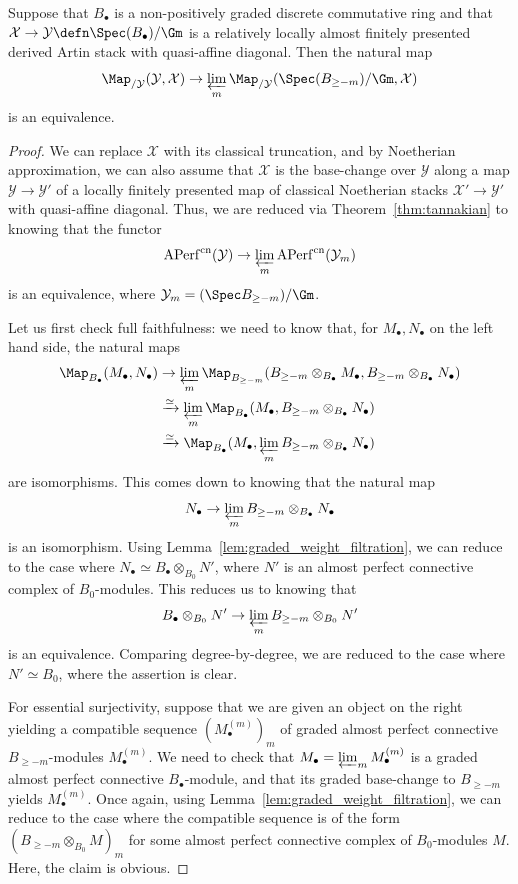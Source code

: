 \documentclass[10pt]{amsart}
\begin{document}
\begin{proposition}
\label{prop:graded_completeness}
Suppose that $B_\bullet$ is a non-positively graded discrete commutative ring and that $\mathcal{X}\to \mathcal{Y}\defn \Spec(B_\bullet)/\Gm$ is a relatively locally almost finitely presented derived Artin stack with quasi-affine diagonal. Then the natural map
\[
\Map_{/\mathcal{Y}}(\mathcal{Y},\mathcal{X})\to \varprojlim_m \Map_{/\mathcal{Y}}(\Spec(B_{\ge -m})/\Gm,\mathcal{X})
\]
is an equivalence.
\end{proposition}  
\begin{proof}
 We can replace $\mathcal{X}$ with its classical truncation, and by Noetherian approximation, we can also assume that $\mathcal{X}$ is the base-change over $\mathcal{Y}$ along a map $\mathcal{Y}\to \mathcal{Y}'$ of a locally finitely presented map of classical Noetherian stacks $\mathcal{X}'\to \mathcal{Y}'$ with quasi-affine diagonal. Thus, we are reduced via Theorem~\ref{thm:tannakian} to knowing that the functor
\[
\mathrm{APerf}^{\mathrm{cn}}(\mathcal{Y})\to \varprojlim_m \mathrm{APerf}^{\mathrm{cn}}(\mathcal{Y}_m)
\]
is an equivalence, where $\mathcal{Y}_m = (\Spec B_{\ge -m})/\Gm$. 

Let us first check full faithfulness: we need to know that, for $M_\bullet,N_\bullet$ on the left hand side, the natural maps
\begin{align*}
\Map_{B_\bullet}(M_\bullet,N_\bullet)&\to \varprojlim_m\Map_{B_{\ge -m}}(B_{\ge -m}\otimes_{B_\bullet}M_\bullet,B_{\ge -m}\otimes_{B_\bullet}N_\bullet)\\
&\xrightarrow{\simeq}\varprojlim_m\Map_{B_\bullet}(M_\bullet,B_{\ge -m}\otimes_{B_\bullet}N_\bullet)\\
&\xrightarrow{\simeq}\Map_{B_\bullet}(M_\bullet,\varprojlim_m B_{\ge -m}\otimes_{B_\bullet}N_\bullet)
\end{align*}
are isomorphisms. This comes down to knowing that the natural map
\[
N_\bullet \to \varprojlim_m B_{\ge -m}\otimes_{B_\bullet}N_\bullet
\]
is an isomorphism. Using Lemma~\ref{lem:graded_weight_filtration}, we can reduce to the case where $N_\bullet \simeq B_\bullet\otimes_{B_0}N'$, where $N'$ is an almost perfect connective complex of $B_0$-modules. This reduces us to knowing that
\[
B_{\bullet}\otimes_{B_0}N'\to  \varprojlim_{m} B_{\ge -m}\otimes_{B_0}N'
\]
is an equivalence. Comparing degree-by-degree, we are reduced to the case where $N'\simeq B_0$, where the assertion is clear.

For essential surjectivity, suppose that we are given an object on the right yielding a compatible sequence $(M^{(m)}_\bullet)_m$ of graded almost perfect connective $B_{\ge -m}$-modules $M^{(m)}_\bullet$. We need to check that $M_\bullet = \varprojlim_m M^{(m)}_\bullet$ is a graded almost perfect connective $B_\bullet$-module, and that its graded base-change to $B_{\ge -m}$ yields $M^{(m)}_\bullet$. Once again, using Lemma~\ref{lem:graded_weight_filtration}, we can reduce to the case where the compatible sequence is of the form $(B_{\ge -m}\otimes_{B_0}M)_m$ for some almost perfect connective complex of $B_0$-modules $M$. Here, the claim is obvious.
 \end{proof} 
\end{document}

